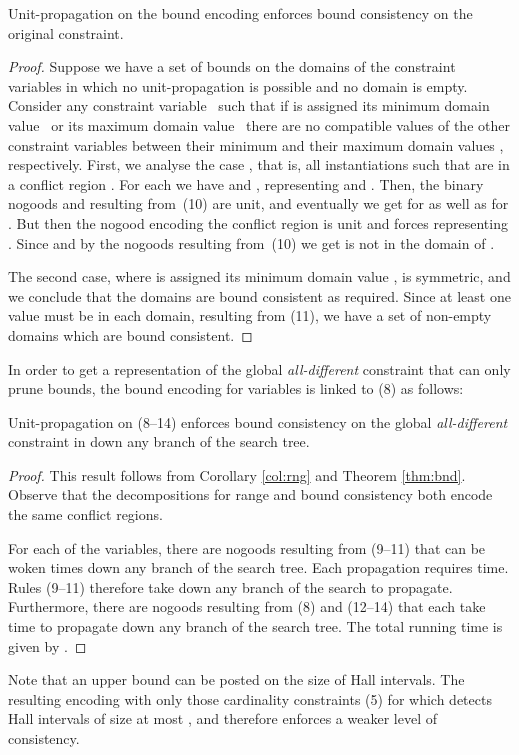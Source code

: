 \documentclass{tlp}
\begin{document}
\begin{theorem} \label{thm:bnd}
Unit-propagation on the bound encoding enforces bound consistency on the original constraint.
\end{theorem}
\begin{proof}
Suppose we have a set of bounds on the domains of the constraint variables in which no unit-propagation is possible and no domain is empty.
Consider any constraint variable~ such that if  is assigned its minimum domain value~ or its maximum domain value~ there are no compatible values of the other constraint variables  between their minimum  and their maximum domain values , respectively. First, we analyse the case , that is, all instantiations such that  are in a conflict region . For each  we have  and , representing  and .
Then, the binary nogoods  and  resulting from~(10) are unit, and eventually we get  for  as well as  for . But then the nogood  encoding the conflict region is unit and forces  representing .
Since  and by the nogoods resulting from~(10) we get  is not in the domain of .

The second case, where  is assigned its minimum domain value , is symmetric, and we conclude that the domains are bound consistent as required.
Since at least one value must be in each domain, resulting from (11), we have a set of non-empty domains which are bound consistent.
\end{proof}
In order to get a representation of the global \emph{all-different} constraint that can only prune bounds, the bound encoding for variables is linked to (8) as follows:

\begin{corollary}
Unit-propagation on (8--14) enforces bound consistency on the global \emph{all-different} constraint in  down any branch of the search tree.
\end{corollary}
\begin{proof} This result follows from Corollary \ref{col:rng} and Theorem \ref{thm:bnd}. Observe that the decompositions for range and bound consistency both encode the same conflict regions.

For each of the  variables, there are  nogoods resulting from (9--11) that can be woken  times down any branch of the search tree. Each propagation requires  time. Rules (9--11) therefore take  down any branch of the search to propagate. Furthermore, there are  nogoods resulting from (8) and (12--14) that each take  time to propagate down any branch of the search tree. The total running time is given by .
\end{proof}
Note that an upper bound  can be posted on the size of Hall intervals. The resulting encoding with only those cardinality constraints (5) for which  detects Hall intervals of size at most , and therefore enforces a weaker level of consistency.
\end{document}
